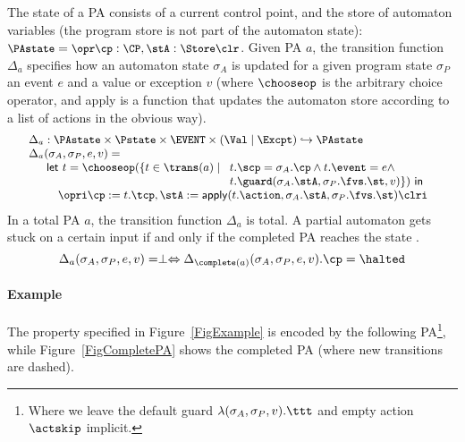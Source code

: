 The state of a PA consists of a current control point, and the store of
automaton variables (the program store is not part of the automaton state):
\({\small
\PAstate = \opr \cp : \CP, \stA : \Store \clr}
\). Given PA \(a\), the transition function \(\Delta_a\) specifies how
an automaton state \(\sigma_A\) is updated for a given program state
\(\sigma_P\) an event \(e\) and a value or exception \(v\) (where
\(\chooseop\) is the arbitrary choice operator, and \textsf{apply} is
a function that updates the automaton store according to a list of
actions in the obvious way).
\[{\small
\begin{array}{l}
\Delta_a  :  \PAstate \times \Pstate \times \EVENT \times (\Val \mid
\Excpt) \hookrightarrow
\PAstate\\
\Delta_a(\sigma_A, \sigma_P, e, v) = \\
\quad
\begin{array}[t]{l}
\mathsf{let\ }t = \chooseop(\{t\in \trans(a)\mid
  \begin{array}[t]{l}
     t.\scp = \sigma_A.\cp \wedge t.\event = e \wedge \\
     t.\guard(\sigma_A.\stA, \sigma_P.\fvs.\st, v)\}) \mathsf{\ in}
  \end{array}\\
\quad \opri \cp := t.\tcp, \stA := \mathsf{apply}(t.\action,
\sigma_A.\stA, \sigma_P.\fvs.\st) \clri
\end{array}

\end{array}}
\]
In a total PA $a$, the transition function \(\Delta_a\) is total.
A partial automaton gets stuck on a certain input if and only if the
completed PA reaches the state \halted.
\vspace*{-.5em}
\begin{equation}\label{PAcompletionProp}
\Delta_a(\sigma_A, \sigma_P, e, v) = \perp \Leftrightarrow
\Delta_{\complete(a)}(\sigma_A, \sigma_P, e, v).\cp = \halted
\end{equation}


\paragraph{Example}
The property specified in Figure~\ref{FigExample} is encoded by the
following PA\footnote{Where we leave the default guard
\(\lambda(\sigma_A, \sigma_P, v). \ttt\) and  empty action
\(\actskip\) implicit.}, while Figure~\ref{FigCompletePA} shows the
completed PA (where new transitions are dashed).

